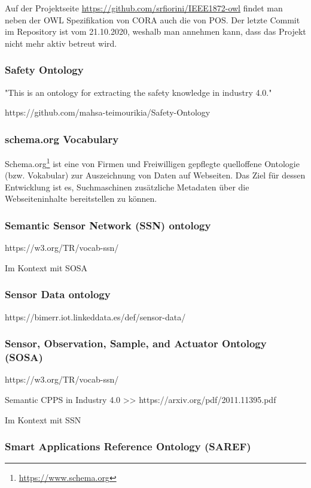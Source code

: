 \documentclass{article}
\begin{document}
Auf der Projektseite \url{https://github.com/srfiorini/IEEE1872-owl} findet man neben der OWL Spezifikation von CORA auch die von POS. Der letzte Commit im Repository ist vom 21.10.2020, weshalb man annehmen kann, dass das Projekt nicht mehr aktiv betreut wird.

\subsubsection{Safety Ontology}

"This is an ontology for extracting the safety knowledge in industry 4.0."

https://github.com/mahsa-teimourikia/Safety-Ontology

\subsubsection{schema.org Vocabulary}

Schema.org\footnote{\url{https://www.schema.org}} ist eine von Firmen und Freiwilligen gepflegte quelloffene Ontologie (bzw. Vokabular) zur Auszeichnung von Daten auf Webseiten.
Das Ziel für dessen Entwicklung ist es, Suchmaschinen zusätzliche Metadaten über die Webseiteninhalte bereitstellen zu können.

\subsubsection{Semantic Sensor Network (SSN) ontology}

https://w3.org/TR/vocab-ssn/

Im Kontext mit SOSA

\subsubsection{Sensor Data ontology}

https://bimerr.iot.linkeddata.es/def/sensor-data/

\subsubsection{Sensor, Observation, Sample, and Actuator Ontology (SOSA)}

https://w3.org/TR/vocab-ssn/

Semantic CPPS in Industry 4.0 >> https://arxiv.org/pdf/2011.11395.pdf

Im Kontext mit SSN

\subsubsection{Smart Applications Reference Ontology (SAREF)}
\end{document}
